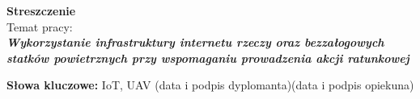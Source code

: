 \newpage
\begin{center}
 {\large\bf  Streszczenie} \\
\vskip 1cm
Temat pracy:\\
\textit{\bf Wykorzystanie infrastruktury internetu rzeczy oraz bezzałogowych statków powietrznych przy wspomaganiu prowadzenia akcji ratunkowej}\\
\end{center}

\noindent
\noindent
\textbf{Słowa kluczowe:} IoT, UAV
\vskip 2cm
\noindent
(data i podpis dyplomanta)\hfill (data i podpis opiekuna)

